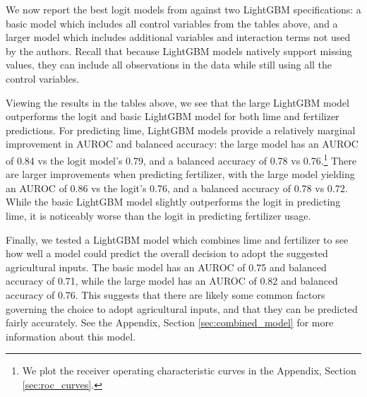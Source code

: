 \documentclass[12pt]{article}
\begin{document}
We now report the best logit models from \textcite{fabregas_digital_2025} against two LightGBM specifications: a basic model which includes all control variables from the tables above, and a larger model which includes additional variables and interaction terms not used by the authors. Recall that because LightGBM models natively support missing values, they can include all observations in the data while still using all the control variables.




Viewing the results in the tables above, we see that the large LightGBM model outperforms the logit and basic LightGBM model for both lime and fertilizer predictions. For predicting lime, LightGBM models provide a relatively marginal improvement in AUROC and balanced accuracy: the large model has an AUROC of 0.84 vs the logit model's 0.79, and a balanced accuracy of 0.78 vs 0.76.\footnote{We plot the receiver operating characteristic curves in the Appendix, Section \ref{sec:roc_curves}.} There are larger improvements when predicting fertilizer, with the large model yielding an AUROC of 0.86 vs the logit's 0.76, and a balanced accuracy of 0.78 vs 0.72. While the basic LightGBM model slightly outperforms the logit in predicting lime, it is noticeably worse than the logit in predicting fertilizer usage.

Finally, we tested a LightGBM model which combines lime and fertilizer to see how well a model could predict the overall decision to adopt the suggested agricultural inputs. The basic model has an AUROC of 0.75 and balanced accuracy of 0.71, while the large model has an AUROC of 0.82 and balanced accuracy of 0.76. This suggests that there are likely some common factors governing the choice to adopt agricultural inputs, and that they can be predicted fairly accurately. See the Appendix, Section \ref{sec:combined_model} for more information about this model.
\end{document}
